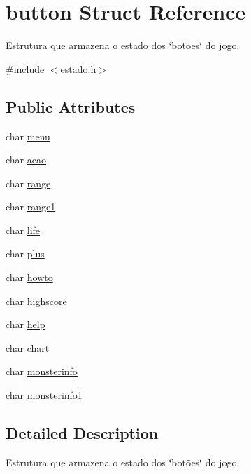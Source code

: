 \hypertarget{structbutton}{}\section{button Struct Reference}
\label{structbutton}


Estrutura que armazena o estado dos \char`\"{}botões\char`\"{} do jogo.  




{\ttfamily \#include $<$estado.\+h$>$}

\subsection*{Public Attributes}
\begin{DoxyCompactItemize}
\item 
char \hyperlink{structbutton_a4d9741b925ef0f23771c335b4ff92dee}{menu}
\item 
char \hyperlink{structbutton_ad914404cfbc8f53485a9bbf08162c9d1}{acao}
\item 
char \hyperlink{structbutton_af31456c0c03cc93a833bf936cdaa481d}{range}
\item 
char \hyperlink{structbutton_adbb6f7957d173000fd70efff43357a6e}{range1}
\item 
char \hyperlink{structbutton_ab4e066179b4fbd5477093c096850c3a7}{life}
\item 
char \hyperlink{structbutton_a52e46dd860de1b0afac5e129bbf9558e}{plus}
\item 
char \hyperlink{structbutton_abe1ea44fec6f7b4c30066154cf65cc90}{howto}
\item 
char \hyperlink{structbutton_a8f6b8a8fe70bb20cf466c78ae9105f99}{highscore}
\item 
char \hyperlink{structbutton_a02ed4060db18a4379dfd33b390ec2b26}{help}
\item 
char \hyperlink{structbutton_a77b091561b8c671e3330fa42e7f5b1fb}{chart}
\item 
char \hyperlink{structbutton_a4a499a690e06dfcd252b5864bb38d7e1}{monsterinfo}
\item 
char \hyperlink{structbutton_aa94cb302b46e76753a1f647d77f686f0}{monsterinfo1}
\end{DoxyCompactItemize}


\subsection{Detailed Description}
Estrutura que armazena o estado dos \char`\"{}botões\char`\"{} do jogo. 

